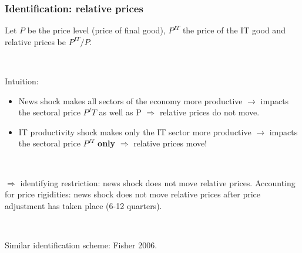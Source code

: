 \documentclass{beamer}
\begin{document}
\begin{frame}
	\frametitle{Identification: relative prices}

Let $P$ be the price level (price of final good), $P^{IT}$ the price of the IT good and relative prices be $P^{IT}/P$.

\

Intuition:
\begin{itemize}
\item News shock makes all sectors of the economy more productive $\rightarrow$ impacts the sectoral price $P^IT$ as well as P $\Rightarrow$ relative prices do not move.
\item IT productivity shock makes only the IT sector more productive $\rightarrow$ impacts the sectoral price $P^{IT}$ \textbf{only} $\Rightarrow$ relative prices move! 
\end{itemize}

\

$\Rightarrow$ identifying restriction: news shock does not move relative prices.
\newline Accounting for price rigidities: news shock does not move relative prices after price adjustment has taken place (6-12 quarters).

\

Similar identification scheme: Fisher 2006.

%
%
%
%
%
%
%
%
%



\end{frame}
\end{document}
